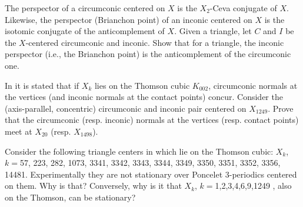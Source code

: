\begin{question}
The perspector of a circumconic centered on $X$ is the $X_2$-Ceva conjugate of $X$. Likewise, the perspector (Brianchon point) of an inconic centered on $X$ is the isotomic conjugate of the anticomplement of $X$. Given a triangle, let $C$ and $I$ be the $X$-centered circumconic and inconic. Show that for a triangle, the inconic perspector (i.e., the Brianchon point) is the anticomplement of the circumconic one.
\end{question}

\begin{question}
In \cite{gibert2021-thomson} it is stated that if $X_k$ lies on the Thomson cubic $K_{002}$, circumconic normals at the vertices (and inconic normals at the contact points) concur. Consider the (axis-parallel, concentric) circumconic and inconic pair centered on $X_{1249}$. Prove that the circumconic (resp. inconic) normals at the vertices (resp. contact points) meet at $X_{20}$ (resp. $X_{1498}$).
\end{question}

\begin{question}
Consider the following triangle centers in \cite{gibert2021-thomson} which lie on the Thomson cubic: $X_k$, $k=$57, 223, 282, 1073, 3341, 3342, 3343, 3344, 3349, 3350, 3351, 3352, 3356, 14481. Experimentally they are not stationary over Poncelet 3-periodics centered on them. Why is that? Conversely, why is it that $X_k$, $k=$1,2,3,4,6,9,1249 , also on the Thomson, can be stationary?
\end{question}


